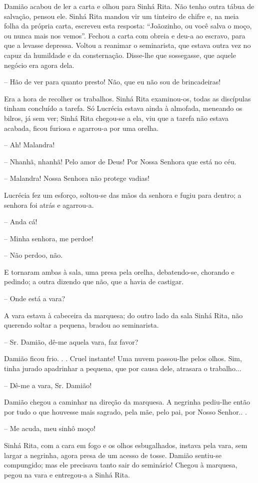 Damião acabou de ler a carta e olhou para Sinhá Rita. Não tenho outra
tábua de salvação, pensou ele. Sinhá Rita mandou vir um tinteiro de
chifre e, na meia folha da própria carta, escreveu esta resposta:
``Joãozinho, ou você salva o moço, ou nunca mais nos vemos''. Fechou a
carta com obreia e deu-a ao escravo, para que a levasse depressa. Voltou
a reanimar o seminarista, que estava outra vez no capuz da humildade e
da consternação. Disse-lhe que sossegasse, que aquele negócio era agora
dela.

-- Hão de ver para quanto presto! Não, que eu não sou de brincadeiras!

Era a hora de recolher os trabalhos. Sinhá Rita examinou-os, todas as
discípulas tinham concluído a tarefa. Só Lucrécia estava ainda à
almofada, meneando os bilros, já sem ver; Sinhá Rita chegou-se a ela,
viu que a tarefa não estava acabada, ficou furiosa e agarrou-a por uma
orelha.

-- Ah! Malandra!

-- Nhanhã, nhanhã! Pelo amor de Deus! Por Nossa Senhora que está no céu.

-- Malandra! Nossa Senhora não protege vadias!

Lucrécia fez um esforço, soltou-se das mãos da senhora e fugiu para
dentro; a senhora foi atrás e agarrou-a.

-- Anda cá!

-- Minha senhora, me perdoe!

-- Não perdoo, não.

E tornaram ambas à sala, uma presa pela orelha, debatendo-se, chorando e
pedindo; a outra dizendo que não, que a havia de castigar.

-- Onde está a vara?

A vara estava à cabeceira da marquesa; do outro lado da sala Sinhá Rita,
não querendo soltar a pequena, bradou ao seminarista.

-- Sr. Damião, dê-me aquela vara, faz favor?

Damião ficou frio. . . Cruel instante! Uma nuvem passou-lhe pelos olhos.
Sim, tinha jurado apadrinhar a pequena, que por causa dele, atrasara o
trabalho...

-- Dê-me a vara, Sr. Damião!

Damião chegou a caminhar na direção da marquesa. A negrinha pediu-lhe
então por tudo o que houvesse mais sagrado, pela mãe, pelo pai, por
Nosso Senhor.. .

-- Me acuda, meu sinhô moço!

Sinhá Rita, com a cara em fogo e os olhos esbugalhados, instava pela
vara, sem largar a negrinha, agora presa de um acesso de tosse. Damião
sentiu-se compungido; mas ele precisava tanto sair do seminário! Chegou
à marquesa, pegou na vara e entregou-a a Sinhá Rita.

